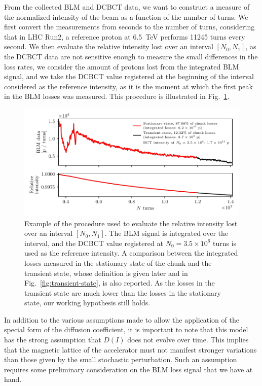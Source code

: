 From the collected BLM and DCBCT data, we want to construct a measure of the normalized intensity of the beam as a function of the number of turns. We first convert the measurements from seconds to the number of turns, considering that in LHC Run2, a reference proton at \SI{6.5}{TeV} performs 11245 turns every second. We then evaluate the relative intensity lost over an interval $[N_0, N_1]$, as the DCBCT data are not sensitive enough to measure the small differences in the loss rates, we consider the amount of protons lost from the integrated BLM signal, and we take the DCBCT value registered at the beginning of the interval considered as the reference intensity, as it is the moment at which the first peak in the BLM losses was measured. This procedure is illustrated in Fig.~\ref{fig:blm-to-intensity}.

\begin{figure}[th]
    \centering
    \includegraphics[width=1.0\textwidth]{5_wire_compensators_LHC/figs/stationary_transient_example_chunk.pdf}
    \caption{Example of the procedure used to evaluate the relative intensity lost over an interval $[N_0, N_1]$. The BLM signal is integrated over the interval, and the DCBCT value registered at $N_0=3.5\times10^6$ turns is used as the reference intensity. A comparison between the integrated losses measured in the stationary state of the chunk and the transient state, whose definition is given later and in Fig.~\ref{fig:transient-state}, is also reported. As the losses in the transient state are much lower than the losses in the stationary state, our working hypothesis still holds.}
    \label{fig:blm-to-intensity}
\end{figure}

In addition to the various assumptions made to allow the application of the special form of the diffusion coefficient, it is important to note that this model has the strong assumption that $D(I)$ does not evolve over time. This implies that the magnetic lattice of the accelerator must not manifest stronger variations than those given by the small stochastic perturbation. Such an assumption requires some preliminary consideration on the BLM loss signal that we have at hand.

